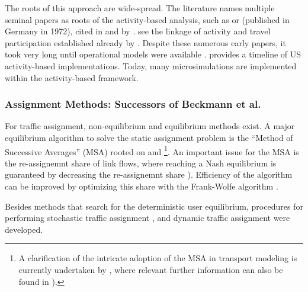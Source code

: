 The roots of this approach are wide-spread. The literature names multiple seminal papers as roots of the activity-based analysis, such as \citet[][]{Haegerstrand_PRSA_1970, Chapin_1974, FriedEtAl_ResRep_NCHRP_1977} or \citet[][]{Kreibich_Transportation_1979} (published in Germany in 1972), cited in \citet[][]{AxhausenHerz_JTE_1989} and by \citet[][p.165]{Miller_ABTFC_1996}. \citet[][Section 3]{McNallyRindt_TechRep_UCI_2008} see the linkage of activity and travel participation established already by \citet[][]{MitchellRapkin_1954}. Despite these numerous early papers, it took very long until operational models were available \citep[][p.31]{BoyceWilliams_ERSA_2003}. \citet[][Figure 2]{Bowman_TEC_2009_1} provides a timeline of US activity-based implementations. Today, many microsimulations are implemented within the activity-based framework.

\subsubsection{Assignment Methods: Successors of Beckmann et al.}
For traffic assignment, non-equilibrium \citep[][]{Matsoukis_TPT_1986} and equilibrium methods \citep[][]{MatsoukisMichalopoulos_TPT_1986, Patriksson_1994} exist. A major equilibrium algorithm to solve the static assignment problem is the ``Method of Successive Averages'' (MSA) rooted on \citet[][]{RobbinsMonro_AMS_1951} and \citet[][]{Blum_AMS_1954} \footnote{
A clarification of the intricate adoption of the MSA in transport modeling is currently undertaken by \citet[][]{BoyceWilliams_forthcoming}, where relevant further information can also be found in \citet[][]{Smock_HRBB_1962, LeBlanc_PhDThesis_1973, Nguyen_TransScience_1974, LeBlancEtAl_TransRes_1975, VanVliet_BonsallEtAl_1977, SheffiPowell_TransResB_1981}).
}. An important issue for the MSA is the re-assignemnt share of link flows, where reaching a Nash equilibrium is guaranteed by decreasing the re-assignemnt share \citep[see, e.g.,][]{PowellSheffi_TransScience_1982, Sheffi_1985}). Efficiency of the algorithm can be improved by optimizing this share with the Frank-Wolfe algorithm \citep[][]{FrankWolfe_NRLQ_1956}.

Besides methods that search for the deterministic user equilibrium, procedures for performing stochastic traffic assignment \citet[see e.g.,][]{Dial_TransRes_1971, SheffiPowell_TransResB_1981, Willumsen_HensherButton_2000, CorreaStier_Cochran_2010}, and dynamic traffic assignment \citep[][]{PeetaZiliaskopoulos_NSE_2001, LinDYEtAl_TRR_2008, ChiuEtAl_TechRep_TRB_2010, FrieszBernstein_HensherButton_2000} were developed.


